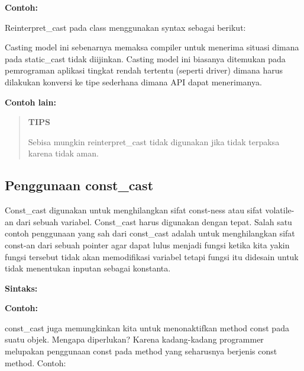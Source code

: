 

\textbf{Contoh:}



Reinterpret\_cast pada class menggunakan syntax sebagai berikut:



Casting model ini sebenarnya memaksa compiler untuk menerima situasi
dimana pada static\_cast tidak diijinkan. Casting model ini biasanya
ditemukan pada pemrograman aplikasi tingkat rendah tertentu (seperti
driver) dimana harus dilakukan konversi ke tipe sederhana dimana API
dapat menerimanya.



\textbf{Contoh lain:}



\begin{quotation}
{\LARGE {}}  \textbf{TIPS} 

Sebisa
mungkin reinterpret\_cast tidak digunakan jika tidak terpaksa karena
tidak aman.
\end{quotation}


\subsection{Penggunaan const\_cast}\label{penggunaan-constux5fcast}

Const\_cast digunakan untuk menghilangkan sifat const-ness atau sifat
volatile-an dari sebuah variabel. Const\_cast harus digunakan dengan
tepat. Salah satu contoh penggunaan yang sah dari const\_cast adalah
untuk menghilangkan sifat const-an dari sebuah pointer agar dapat lulus
menjadi fungsi ketika kita yakin fungsi tersebut tidak akan memodifikasi
variabel tetapi fungsi itu didesain untuk tidak menentukan inputan
sebagai konstanta.

\textbf{Sintaks:}



\textbf{Contoh:}



const\_cast juga memungkinkan kita untuk menonaktifkan method const pada
suatu objek. Mengapa diperlukan? Karena kadang-kadang programmer
melupakan penggunaan const pada method yang seharusnya berjenis const
method. Contoh:

